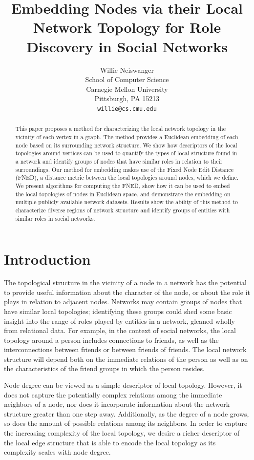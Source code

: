 \documentclass{article}
\title{Embedding Nodes via their Local Network Topology for Role Discovery in Social Networks}
\author{
Willie Neiswanger\\
School of Computer Science\\
Carnegie Mellon University\\
Pittsburgh, PA 15213 \\
\texttt{willie@cs.cmu.edu} \\
}
\begin{document}
\maketitle

\begin{abstract}
This paper proposes a method for characterizing the local network topology in the vicinity of each vertex in a graph. The method provides a Euclidean embedding of each node based on its surrounding network structure. We show how descriptors of the local topologies around vertices can be used to quantify the types of local structure found in a network and identify groups of nodes that have similar roles in relation to their surroundings. Our method for embedding makes use of the Fixed Node Edit Distance (FNED), a distance metric between the local topologies around nodes, which we define. We present algorithms for computing the FNED, show how it can be used to embed the local topologies of nodes in Euclidean space, and demonstrate the embedding on multiple publicly available network datasets. Results show the ability of this method to characterize diverse regions of network structure and identify groups of entities with similar roles in social networks.
\end{abstract}


\section{Introduction}
\label{sec:intro}

The topological structure in the vicinity of a node in a network has the potential to provide useful information about the character of the node, or about the role it plays in relation to adjacent nodes. Networks may contain groups of nodes that have similar local topologies; identifying these groups could shed some basic insight into the range of roles played by entities in a network, gleaned wholly from relational data. For example, in the context of social networks, the local topology around a person includes connections to friends, as well as the interconnections between friends or between friends of friends. The local network structure will depend both on the immediate relations of the person as well as on the characteristics of the friend groups in which the person resides.%

Node degree can be viewed as a simple descriptor of local topology. However, it does not capture the potentially complex relations among the immediate neighbors of a node, nor does it incorporate information about the network structure greater than one step away. Additionally, as the degree of a node grows, so does the amount of possible relations among its neighbors. In order to capture the increasing complexity of the local topology, we desire a richer descriptor of the local edge structure that is able to encode the local topology as its complexity scales with node degree.
\end{document}
